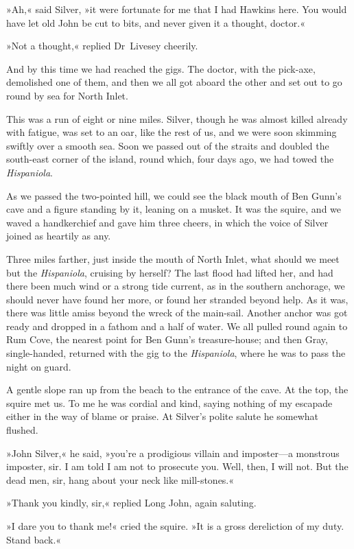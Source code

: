 »Ah,« said Silver, »it were fortunate for me that I had Hawkins here. You would have let old John be cut to bits, and never given it a thought, doctor.«

»Not a thought,« replied Dr~Livesey cheerily.

And by this time we had reached the gigs. The doctor, with the pick-axe, demolished one of them, and then we all got aboard the other and set out to go round by sea for North Inlet.

This was a run of eight or nine miles. Silver, though he was almost killed already with fatigue, was set to an oar, like the rest of us, and we were soon skimming swiftly over a smooth sea. Soon we passed out of the straits and doubled the south-east corner of the island, round which, four days ago, we had towed the \textit{Hispaniola}.

As we passed the two-pointed hill, we could see the black mouth of Ben Gunn's cave and a figure standing by it, leaning on a musket. It was the squire, and we waved a handkerchief and gave him three cheers, in which the voice of Silver joined as heartily as any.

Three miles farther, just inside the mouth of North Inlet, what should we meet but the \textit{Hispaniola}, cruising by herself? The last flood had lifted her, and had there been much wind or a strong tide current, as in the southern anchorage, we should never have found her more, or found her stranded beyond help. As it was, there was little amiss beyond the wreck of the main-sail. Another anchor was got ready and dropped in a fathom and a half of water. We all pulled round again to Rum Cove, the nearest point for Ben Gunn's treasure-house; and then Gray, single-handed, returned with the gig to the \textit{Hispaniola}, where he was to pass the night on guard.

A gentle slope ran up from the beach to the entrance of the cave. At the top, the squire met us. To me he was cordial and kind, saying nothing of my escapade either in the way of blame or praise. At Silver's polite salute he somewhat flushed.

»John Silver,« he said, »you're a prodigious villain and imposter—a monstrous imposter, sir. I am told I am not to prosecute you. Well, then, I will not. But the dead men, sir, hang about your neck like mill-stones.«

»Thank you kindly, sir,« replied Long John, again saluting.

»I dare you to thank me!« cried the squire. »It is a gross dereliction of my duty. Stand back.«

